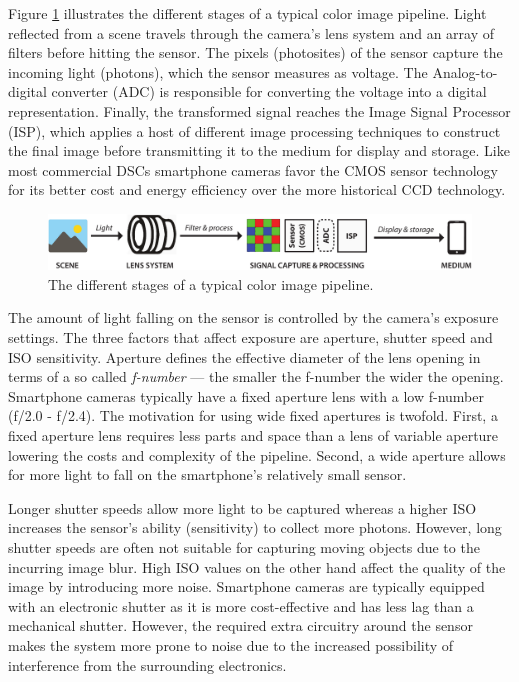 \documentclass[thesis.tex]{subfiles}
\begin{document}
Figure \ref{figure:pipeline} illustrates the different stages of a typical color image pipeline. Light reflected from a scene travels through the camera's lens system and an array of filters before hitting the sensor. The pixels (photosites) of the sensor capture the incoming light (photons), which the sensor measures as voltage. The Analog-to-digital converter (ADC) is responsible for converting the voltage into a digital representation. Finally, the transformed signal reaches the Image Signal Processor (ISP), which applies a host of different image processing techniques to construct the final image before transmitting it to the medium for display and storage. Like most commercial DSCs smartphone cameras favor the CMOS sensor technology for its better cost and energy efficiency over the more historical CCD technology.

\begin{figure}[h]
\centering \includegraphics[width=\textwidth]{images/pipeline}
\caption{The different stages of a typical color image pipeline.\label{figure:pipeline}}
\end{figure}

The amount of light falling on the sensor is controlled by the camera's exposure settings. The three factors that affect exposure are aperture, shutter speed and ISO sensitivity. Aperture defines the effective diameter of the lens opening in terms of a so called \textit{f-number} --- the smaller the f-number the wider the opening. Smartphone cameras typically have a fixed aperture lens with a low f-number (f/2.0 - f/2.4). The motivation for using wide fixed apertures is twofold. First, a fixed aperture lens requires less parts and space than a lens of variable aperture lowering the costs and complexity of the pipeline. Second, a wide aperture allows for more light to fall on the smartphone's relatively small sensor.

Longer shutter speeds allow more light to be captured whereas a higher ISO increases the sensor's ability (sensitivity) to collect more photons. However, long shutter speeds are often not suitable for capturing moving objects due to the incurring image blur. High ISO values on the other hand affect the quality of the image by introducing more noise. Smartphone cameras are typically equipped with an electronic shutter as it is more cost-effective and has less lag than a mechanical shutter. However, the required extra circuitry around the sensor makes the system more prone to noise due to the increased possibility of interference from the surrounding electronics.
\end{document}
